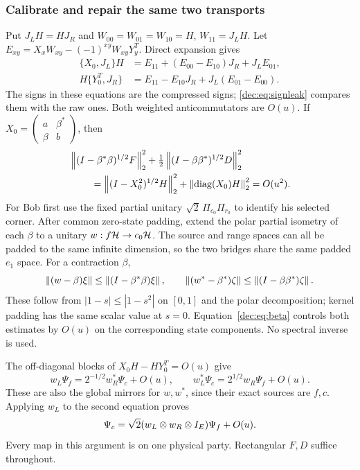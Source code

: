 \subsubsection{Calibrate and repair the same two transports}
Put $J_LH=HJ_R$ and $W_{00}=W_{01}=W_{10}=H$, $W_{11}=J_LH$. Let
$E_{xy}=X_xW_{xy}-(-1)^{xy}W_{xy}Y_y^T$. Direct expansion gives
\begin{align*}
\{X_0,J_L\}H&=E_{11}+(E_{00}-E_{10})J_R+J_LE_{01},\\
H\{Y_0^T,J_R\}&=E_{11}-E_{10}J_R+J_L(E_{01}-E_{00}).
\end{align*}
The signs in these equations are the compressed signs; \eqref{dec:eq:signleak} compares them with the raw ones. Both weighted anticommutators are $O(u)$. If
$X_0=\left(\begin{smallmatrix}a&\beta^*\\\beta&b\end{smallmatrix}\right)$, then
\begin{align}\label{dec:eq:beta}
&\left\lVert(I-\beta^*\beta)^{1/2}F\right\rVert_2^2
+\tfrac12\left\lVert(I-\beta\beta^*)^{1/2}D\right\rVert_2^2\\
&\hspace{8mm}=\left\lVert(I-X_0^2)^{1/2}H\right\rVert_2^2
+\left\lVert\operatorname{diag}(X_0)H\right\rVert_2^2=O(u^2).\nonumber
\end{align}
For Bob first use the fixed partial unitary $\sqrt2\,\Pi_{c_0}\Pi_{r_0}$ to identify his selected corner. After common zero-state padding, extend the polar partial isometry of each $\beta$ to a unitary $w:f\mathcal H\to c_0\mathcal H$. The source and range spaces can all be padded to the same infinite dimension, so the two bridges share the same padded $e_1$ space. For a contraction $\beta$,
\[
\left\lVert(w-\beta)\xi\right\rVert\le\left\lVert(I-\beta^*\beta)\xi\right\rVert,\qquad
\left\lVert(w^*-\beta^*)\zeta\right\rVert\le\left\lVert(I-\beta\beta^*)\zeta\right\rVert.
\]
These follow from $|1-s|\le|1-s^2|$ on $[0,1]$ and the polar decomposition; kernel padding has the same scalar value at $s=0$. Equation~\eqref{dec:eq:beta} controls both estimates by $O(u)$ on the corresponding state components. No spectral inverse is used.

The off-diagonal blocks of $X_0H-HY_0^T=O(u)$ give
\begin{equation}\label{dec:eq:wvec}
w_L\Psi_f=2^{-1/2}w_R^*\Psi_c+O(u),\qquad
w_L^*\Psi_c=2^{1/2}w_R\Psi_f+O(u).
\end{equation}
These are also the global mirrors for $w,w^*$, since their exact sources are $f,c$. Applying $w_L$ to the second equation proves
\begin{equation}\label{dec:eq:wcomponent}
\Psi_c=\sqrt2(w_L\otimes w_R\otimes I_E)\Psi_f+O(u).
\end{equation}
Every map in this argument is on one physical party. Rectangular $F,D$ suffice throughout.

